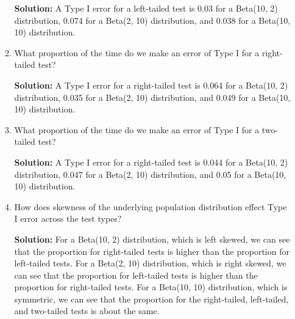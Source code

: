 \documentclass{article}\usepackage[]{graphicx}\usepackage[]{xcolor}
\begin{document}
\begin{enumerate}
\begin{enumerate}
    \textbf{Solution:} A Type I error for a left-tailed test is 0.03 for a Beta(10, 2) distribution, 0.074 for a Beta(2, 10) distribution, and 0.038 for a Beta(10, 10) distribution.
    
    \item What proportion of the time do we make an error of Type I for a
    right-tailed test?
    
    \textbf{Solution:} A Type I error for a right-tailed test is 0.064 for a Beta(10, 2) distribution, 0.035 for a Beta(2, 10) distribution, and 0.049 for a Beta(10, 10) distribution.
    \item What proportion of the time do we make an error of Type I for a
    two-tailed test?
    
    \textbf{Solution:} A Type I error for a right-tailed test is 0.044 for a Beta(10, 2) distribution, 0.047 for a Beta(2, 10) distribution, and 0.05 for a Beta(10, 10) distribution.
    \item How does skewness of the underlying population distribution effect
    Type I error across the test types?
    
    \textbf{Solution:} For a Beta(10, 2) distribution, which is left skewed, we can see that the proportion for right-tailed tests is higher than the proportion for left-tailed tests. For a Beta(2, 10) distribution, which is right skewed, we can see that the proportion for left-tailed tests is higher than the proportion for right-tailed tests. For a Beta(10, 10) distribution, which is symmetric, we can see that the proportion for the right-tailed, left-tailed, and two-tailed tests is about the same. 
  \end{enumerate}
\end{enumerate}

\end{document}
